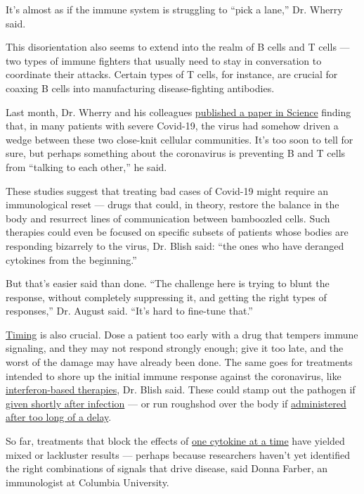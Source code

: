 It's almost as if the immune system is struggling to ``pick a lane,''
Dr. Wherry said.

This disorientation also seems to extend into the realm of B cells and T
cells --- two types of immune fighters that usually need to stay in
conversation to coordinate their attacks. Certain types of T cells, for
instance, are crucial for coaxing B cells into manufacturing
disease-fighting antibodies.

Last month, Dr. Wherry and his colleagues
\href{https://science.sciencemag.org/content/early/2020/07/15/science.abc8511}{published
a paper in Science} finding that, in many patients with severe Covid-19,
the virus had somehow driven a wedge between these two close-knit
cellular communities. It's too soon to tell for sure, but perhaps
something about the coronavirus is preventing B and T cells from
``talking to each other,'' he said.

These studies suggest that treating bad cases of Covid-19 might require
an immunological reset --- drugs that could, in theory, restore the
balance in the body and resurrect lines of communication between
bamboozled cells. Such therapies could even be focused on specific
subsets of patients whose bodies are responding bizarrely to the virus,
Dr. Blish said: ``the ones who have deranged cytokines from the
beginning.''

But that's easier said than done. ``The challenge here is trying to
blunt the response, without completely suppressing it, and getting the
right types of responses,'' Dr. August said. ``It's hard to fine-tune
that.''

\href{https://www.nationalgeographic.com/science/2020/05/how-quieting-cytokine-storms-could-be-key-to-treating-severe-cvd/}{Timing}
is also crucial. Dose a patient too early with a drug that tempers
immune signaling, and they may not respond strongly enough; give it too
late, and the worst of the damage may have already been done. The same
goes for treatments intended to shore up the initial immune response
against the coronavirus, like
\href{https://www.nytimes.com/2020/07/20/world/covid-19-treatment-synairgen-interferon-beta.html}{interferon-based
therapies}, Dr. Blish said. These could stamp out the pathogen if
\href{https://www.cell.com/cell-host-microbe/fulltext/S1931-3128(20)30401-7}{given
shortly after infection} --- or run roughshod over the body if
\href{https://science.sciencemag.org/content/early/2020/06/10/science.abc3545}{administered
after too long of a delay}.

So far, treatments that block the effects of
\href{https://www.nytimes.com/interactive/2020/science/coronavirus-drugs-treatments.html}{one
cytokine at a time} have yielded mixed or lackluster results --- perhaps
because researchers haven't yet identified the right combinations of
signals that drive disease, said Donna Farber, an immunologist at
Columbia University.

